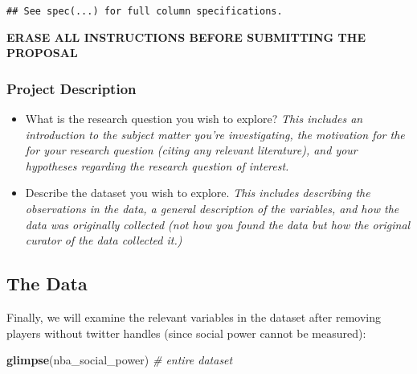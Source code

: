 \documentclass[]{article}
\newenvironment{Shaded}{\begin{snugshade}}{\end{snugshade}}
\newcommand{\CommentTok}[1]{\textcolor[rgb]{0.56,0.35,0.01}{\textit{#1}}}
\newcommand{\KeywordTok}[1]{\textcolor[rgb]{0.13,0.29,0.53}{\textbf{#1}}}
\newcommand{\NormalTok}[1]{#1}
\begin{document}
\begin{verbatim}
## See spec(...) for full column specifications.
\end{verbatim}

\textbf{ERASE ALL INSTRUCTIONS BEFORE SUBMITTING THE PROPOSAL}

\hypertarget{project-description}{%
\subsubsection{Project Description}\label{project-description}}

\begin{itemize}
\item
  What is the research question you wish to explore? \emph{This includes
  an introduction to the subject matter you're investigating, the
  motivation for the for your research question (citing any relevant
  literature), and your hypotheses regarding the research question of
  interest.}
\item
  Describe the dataset you wish to explore. \emph{This includes
  describing the observations in the data, a general description of the
  variables, and how the data was originally collected (not how you
  found the data but how the original curator of the data collected
  it.)}
\end{itemize}

\hypertarget{the-data}{%
\subsection{The Data}\label{the-data}}

Finally, we will examine the relevant variables in the dataset after
removing players without twitter handles (since social power cannot be
measured):

\begin{Shaded}
\begin{Highlighting}[]
\KeywordTok{glimpse}\NormalTok{(nba_social_power) }\CommentTok{# entire dataset}
\end{Highlighting}
\end{Shaded}
\end{document}
